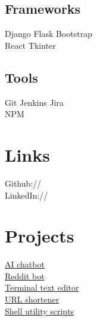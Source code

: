 \documentclass[]{Resume_Piyush}
\begin{document}
\begin{minipage}[t]{0.33\textwidth}
\subsection{Frameworks}
Django \textbullet{}   Flask \textbullet{} Bootstrap \\
React \textbullet{} Tkinter \\
\sectionsep

\subsection{Tools}
Git \textbullet{} Jenkins \textbullet{} Jira \\
NPM
\sectionsep


\section{Links} 
Github:// \href{https://github.com/piymis}{} \\
LinkedIn://  \href{https://www.linkedin.com/in/piymis/}{} \\
\sectionsep




\section{Projects}
\href{https://lex-web-ui-bc-codebuilddeploy-ha15ce-webappbucket-67liriy2mwy2.s3.amazonaws.com/index.html}{AI chatbot} \\
\href{https://github.com/piymis/reddit-bot}{Reddit bot} \\
\href{https://github.com/piymis/Kilo-Clone}{Terminal text editor} \\
\href{}{URL shortener} \\
\href{https://github.com/piymis/utility-scripts}{Shell utility scripts} \\
\sectionsep

%
%

\end{minipage} 
\hfill
\end{document}
